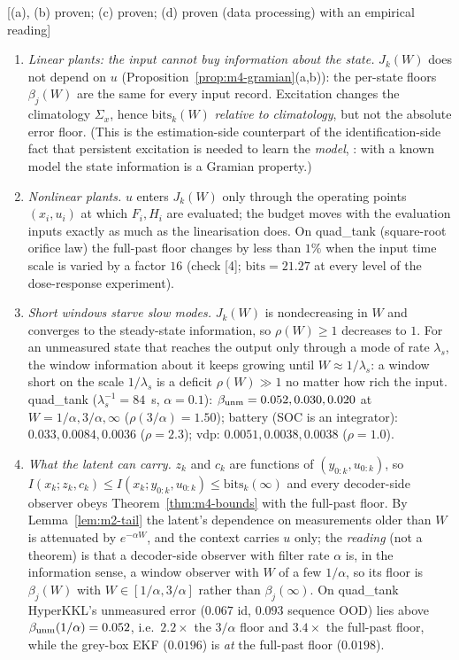 \begin{proposition}\label{prop:m4-excitation}
[(a), (b) proven; (c) proven; (d) proven (data processing) with an empirical reading]
\begin{enumerate}
\item[(a)] \emph{Linear plants: the input cannot buy information about the state.} $J_k(W)$ does not depend on
$u$ (Proposition~\ref{prop:m4-gramian}(a,b)): the per-state floors $\beta_j(W)$ are the same for every input
record. Excitation changes the climatology $\Sigma_x$, hence $\mathrm{bits}_k(W)$ \emph{relative to climatology},
but not the absolute error floor. (This is the estimation-side counterpart of the identification-side fact that
persistent excitation is needed to learn the \emph{model}, \citealp[Ch.~13]{ljung1999system}: with a known model
the state information is a Gramian property.)
\item[(b)] \emph{Nonlinear plants.} $u$ enters $J_k(W)$ only through the operating points $(x_i,u_i)$ at which
$F_i,H_i$ are evaluated; the budget moves with the evaluation inputs exactly as much as the linearisation does.
On quad\_tank (square-root orifice law) the full-past floor changes by less than $1\%$ when the input time scale is
varied by a factor $16$ (check [4]; $\mathrm{bits}=21.27$ at every level of the dose-response experiment).
\item[(c)] \emph{Short windows starve slow modes.} $J_k(W)$ is nondecreasing in $W$ and converges to the
steady-state information, so $\rho(W)\ge1$ decreases to $1$. For an unmeasured state that reaches the output only
through a mode of rate $\lambda_s$, the window information about it keeps growing until $W\approx1/\lambda_s$: a
window short on the scale $1/\lambda_s$ is a deficit $\rho(W)\gg1$ no matter how rich the input. quad\_tank
($\lambda_s^{-1}=84$~s, $\alpha=0.1$): $\beta_{\rm unm}=0.052,0.030,0.020$ at $W=1/\alpha,3/\alpha,\infty$
($\rho(3/\alpha)=1.50$); battery (SOC is an integrator): $0.033,0.0084,0.0036$ ($\rho=2.3$); vdp: $0.0051,0.0038,0.0038$
($\rho=1.0$).
\item[(d)] \emph{What the latent can carry.} $z_k$ and $c_k$ are functions of $(y_{0:k},u_{0:k})$, so
$I(x_k;z_k,c_k)\le I(x_k;y_{0:k},u_{0:k})\le\mathrm{bits}_k(\infty)$ and every decoder-side observer obeys
Theorem~\ref{thm:m4-bounds} with the full-past floor. By Lemma~\ref{lem:m2-tail} the latent's dependence on
measurements older than $W$ is attenuated by $e^{-\alpha W}$, and the context carries $u$ only; the \emph{reading}
(not a theorem) is that a decoder-side observer with filter rate $\alpha$ is, in the information sense, a window
observer with $W$ of a few $1/\alpha$, so its floor is $\beta_j(W)$ with $W\in[1/\alpha,3/\alpha]$ rather than
$\beta_j(\infty)$. On quad\_tank HyperKKL's unmeasured error ($0.067$ id, $0.093$ sequence OOD) lies above
$\beta_{\rm unm}(1/\alpha)=0.052$, i.e.\ $2.2\times$ the $3/\alpha$ floor and $3.4\times$ the full-past floor, while the
grey-box EKF ($0.0196$) is \emph{at} the full-past floor ($0.0198$).
\end{enumerate}
\end{proposition}
